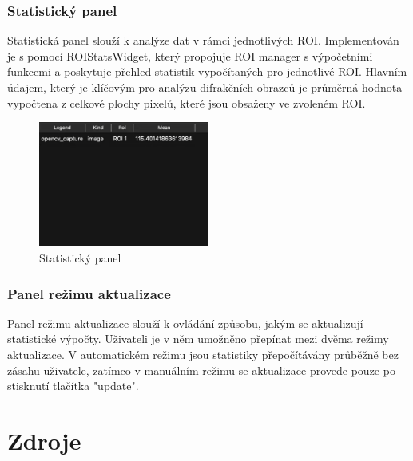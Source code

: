 \documentclass{article}
\begin{document}
\subsubsection{Statistický panel}
Statistická panel slouží k analýze dat v rámci jednotlivých ROI. Implementován je s pomocí ROIStatsWidget, který propojuje ROI manager s výpočetními funkcemi a poskytuje přehled statistik vypočítaných pro jednotlivé ROI. Hlavním údajem, který je klíčovým pro analýzu difrakčních obrazců je průměrná hodnota vypočtena z celkové plochy pixelů, které jsou obsaženy ve zvoleném ROI.
\begin{figure}[htp]
    \centering
    \includegraphics[width=0.5\textwidth]{images/StatistickyPanel.png}
    \caption{Statistický panel}
\end{figure}
\subsubsection{Panel režimu aktualizace}
Panel režimu aktualizace slouží k ovládání způsobu, jakým se aktualizují statistické výpočty. Uživateli je v něm umožněno přepínat mezi dvěma režimy aktualizace. V automatickém režimu jsou statistiky přepočítávány průběžně bez zásahu uživatele, zatímco v manuálním režimu se aktualizace provede pouze po stisknutí tlačítka "update".

\newpage
\section{Zdroje}
\nocite{*}

\printbibliography
\end{document}
